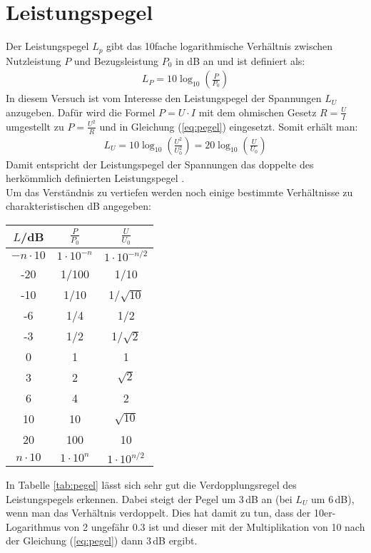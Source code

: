 \section{Leistungspegel}
\label{sec:pegel}
Der Leistungspegel $L_p$ gibt das 10fache logarithmische Verhältnis zwischen Nutzleistung $P$ und Bezugsleistung $P_0$ in \si{\deci\bel} an und ist definiert als:
\begin{gather}
    L_P = 10 \log_{10}\left(\frac{P}{P_0}\right)
    \label{eq:pegel}
\end{gather}
In diesem Versuch ist vom Interesse den Leistungspegel der Spannungen $L_U$ anzugeben. Dafür wird die Formel $P = U \cdot I$ mit dem ohmischen Gesetz $R = \frac{U}{I}$ umgestellt zu $P = \frac{U^2}{R}$ und in Gleichung (\ref{eq:pegel}) eingesetzt. Somit erhält man:
\begin{gather}
    L_U = 10 \log_{10}\left(\frac{U^2}{U_0^2}\right) = 20 \log_{10}\left(\frac{U}{U_0}\right)
    \label{eq:spannungpegel}
\end{gather}
Damit entspricht der Leistungspegel der Spannungen das doppelte des herkömmlich definierten Leistungspegel \citep{electronik}.\\
Um das Verständnis zu vertiefen werden noch einige bestimmte Verhältnisse zu charakteristischen \si{\deci\bel} angegeben:
\begin{center}
    \begin{tabular}{c | c c}
        $L$/dB & $\frac{P}{P_0}$ & $\frac{U}{U_0}$\\
        \hline
        $-n\cdot10$ & $1\cdot10^{-n}$ &  $1\cdot10^{-n/2}$ \\
        -20 & 1/100 & 1/10 \\
        -10 & 1/10 & 1/$\sqrt{10}$ \\
        -6 & 1/4 & 1/2\\
        -3 & 1/2 & 1/$\sqrt{2}$\\
        0 & 1 & 1\\
        3 & 2 & $\sqrt{2}$\\
        6 & 4 & 2\\
        10 & 10 & $\sqrt{10}$ \\
        20 & 100 & 10 \\
        $n\cdot10$ & $1\cdot10^{n}$ &  $1\cdot10^{n/2}$ \\
    \end{tabular}
    \label{tab:pegel}
\end{center}
In Tabelle \ref{tab:pegel} lässt sich sehr gut die Verdopplungsregel des Leistungspegels erkennen. Dabei steigt der Pegel um 3\,dB an (bei $L_U$ um 6\,dB), wenn man das Verhältnis verdoppelt. Dies hat damit zu tun, dass der 10er-Logarithmus von 2 ungefähr 0.3 ist und dieser mit der Multiplikation von 10 nach der Gleichung (\ref{eq:pegel}) dann 3\,dB ergibt.
\newpage
